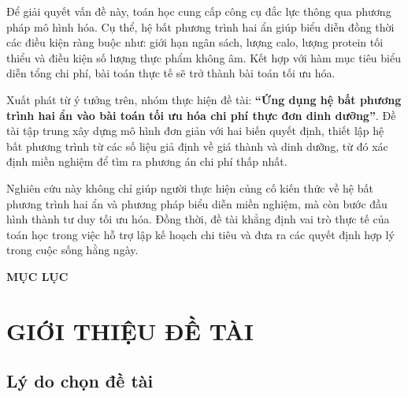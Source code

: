 \documentclass[12pt,a4paper]{article}
\begin{document}
Để giải quyết vấn đề này, toán học cung cấp công cụ đắc lực thông qua phương pháp mô hình hóa. Cụ thể, hệ bất phương trình hai ẩn giúp biểu diễn đồng thời các điều kiện ràng buộc như: giới hạn ngân sách, lượng calo, lượng protein tối thiểu và điều kiện số lượng thực phẩm không âm. Kết hợp với hàm mục tiêu biểu diễn tổng chi phí, bài toán thực tế sẽ trở thành bài toán tối ưu hóa.

Xuất phát từ ý tưởng trên, nhóm thực hiện đề tài:
\textbf{``Ứng dụng hệ bất phương trình hai ẩn vào bài toán tối ưu hóa chi phí thực đơn dinh dưỡng''}. 
Đề tài tập trung xây dựng mô hình đơn giản với hai biến quyết định, thiết lập hệ bất phương trình từ các số liệu giả định về giá thành và dinh dưỡng, từ đó xác định miền nghiệm để tìm ra phương án chi phí thấp nhất.

Nghiên cứu này không chỉ giúp người thực hiện củng cố kiến thức về hệ bất phương trình hai ẩn và phương pháp biểu diễn miền nghiệm, mà còn bước đầu hình thành tư duy tối ưu hóa. Đồng thời, đề tài khẳng định vai trò thực tế của toán học trong việc hỗ trợ lập kế hoạch chi tiêu và đưa ra các quyết định hợp lý trong cuộc sống hằng ngày.





\newpage

\begin{center}
    \textbf{\Large MỤC LỤC}
\end{center}

\vspace{0.5cm}

\tableofcontents

\newpage




\newpage

\section{GIỚI THIỆU ĐỀ TÀI}


\subsection{Lý do chọn đề tài}
\end{document}
